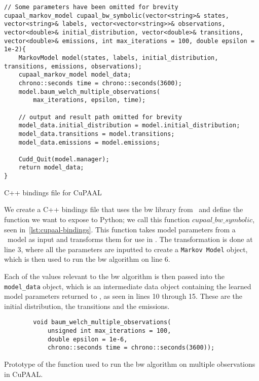 \begin{listing}
    \begin{verbatim}
// Some parameters have been omitted for brevity
cupaal_markov_model cupaal_bw_symbolic(vector<string>& states, vector<string>& labels, vector<vector<string>>& observations, vector<double>& initial_distribution, vector<double>& transitions, vector<double>& emissions, int max_iterations = 100, double epsilon = 1e-2){
    MarkovModel model(states, labels, initial_distribution, transitions, emissions, observations);
    cupaal_markov_model model_data;
    chrono::seconds time = chrono::seconds(3600);
    model.baum_welch_multiple_observations(
        max_iterations, epsilon, time);

    // output and result path omitted for brevity
    model_data.initial_distribution = model.initial_distribution;
    model_data.transitions = model.transitions;
    model_data.emissions = model.emissions;
    
    Cudd_Quit(model.manager);
    return model_data;
}
      \end{verbatim}
    \caption{C++ bindings file for CuPAAL}
    \label{lst:cupaal-bindings}
\end{listing}

We create a C++ bindings file that uses the \gls{bw} library from \Cupaal\ and define the function we want to expose to Python; we call this function $cupaal\_bw\_symbolic$, seen in~\autoref{lst:cupaal-bindings}.
This function takes model parameters from a \Jajapy\ model as input and transforms them for use in \Cupaal.
The transformation is done at line 3, where all the parameters are inputted to create a \texttt{Markov Model} object, which is then used to run the \gls{bw} algorithm on line 6.

Each of the values relevant to the \gls{bw} algorithm is then passed into the \texttt{model\_data} object, which is an intermediate data object containing the learned model parameters returned to \Jajapy, as seen in lines 10 through 15. These are the initial distribution, the transitions and the emissions.


\begin{listing}
    \begin{verbatim}
        void baum_welch_multiple_observations(
            unsigned int max_iterations = 100, 
            double epsilon = 1e-6, 
            chrono::seconds time = chrono::seconds(3600));
        \end{verbatim}
    \caption{Prototype of the function used to run the \gls{bw} algorithm on multiple observations in CuPAAL.}
    \label{lst:baum-welch-multiple-observations}
\end{listing}


